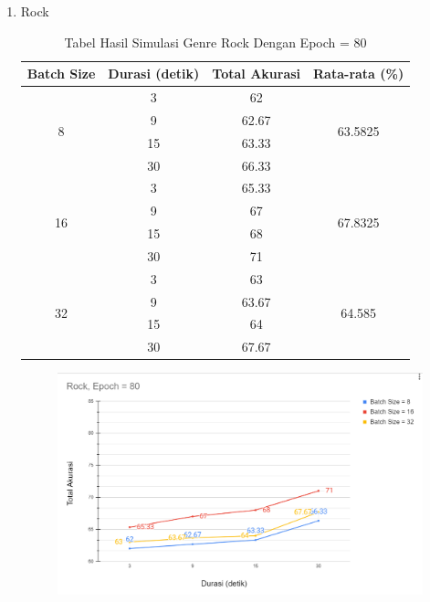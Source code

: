 \begin{enumerate}
	\item Rock
		\begin{longtable}[c]{|c|c|c|c|}
			\caption{Tabel Hasil Simulasi Genre Rock Dengan Epoch = 80}
			\label{tab:my-table}\\
			\hline
			\textbf{Batch Size} & \textbf{Durasi (detik)} & \textbf{Total Akurasi} & \textbf{Rata-rata (\%)}       \\ \hline
			\endfirsthead
			\endhead
			\multirow{4}{*}{8}  & 3                       & 62                     & \multirow{4}{*}{63.5825} \\ \cline{2-3}
			& 9                       & 62.67                  &                          \\ \cline{2-3}
			& 15                      & 63.33                  &                          \\ \cline{2-3}
			& 30                      & 66.33                  &                          \\ \hline
			\multirow{4}{*}{16} & 3                       & 65.33                  & \multirow{4}{*}{67.8325} \\ \cline{2-3}
			& 9                       & 67                     &                          \\ \cline{2-3}
			& 15                      & 68                     &                          \\ \cline{2-3}
			& 30                      & 71                     &                          \\ \hline
			\multirow{4}{*}{32} & 3                       & 63                     & \multirow{4}{*}{64.585}  \\ \cline{2-3}
			& 9                       & 63.67                  &                          \\ \cline{2-3}
			& 15                      & 64                     &                          \\ \cline{2-3}
			& 30                      & 67.67                  &                          \\ \hline
		\end{longtable}
		
		\begin{figure}[H]
			\centering
			
			\includegraphics[width=\textwidth]{gambar/e80_chart_sum accuracy_rock}
			

\end{figure}
\end{enumerate}
